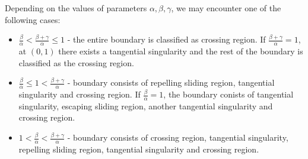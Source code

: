 \documentclass[12pt,a4paper]{article}
\begin{document}
Depending on the values of parameters $\alpha, \beta, \gamma$, we may encounter one of the following cases:
\begin{itemize}
    \item $\frac{\beta}{\alpha} < \frac{\beta + \gamma}{\alpha} \leq 1$ - the entire boundary is classified as crossing region. If $\frac{\beta + \gamma}{\alpha}=1$, at $(0, 1)$ there exists a tangential singularity and the rest of the boundary is classified as the crossing region. 
    \item $\frac{\beta}{\alpha} \leq 1 < \frac{\beta + \gamma}{\alpha}$ - boundary consists of repelling sliding region, tangential singularity and crossing region. If $\frac{\beta}{\alpha} =1$, the boundary conists of tangential singularity, escaping sliding region, another tangential singularity and crossing region. 
    \item $1 < \frac{\beta}{\alpha} < \frac{\beta + \gamma}{\alpha}$ - boundary consists of crossing region, tangential singularity, repelling sliding region, tangential singularity and crossing region.
\end{itemize}
\end{document}
